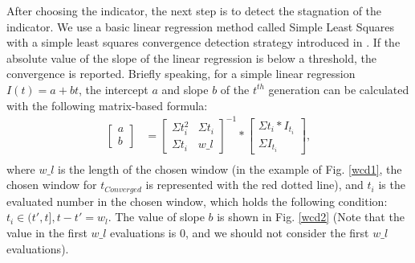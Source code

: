 \documentclass[conference]{IEEEtran}
\begin{document}
After choosing the indicator, the next step is to detect the stagnation of the indicator.
We use a basic linear regression method called Simple Least Squares\cite{SimpleLeastSquares} with a
simple least squares convergence detection strategy introduced in \cite{convergenceDetection:LSSC}.
If the absolute value of the slope of the linear regression is below a threshold, the convergence is reported.
Briefly speaking, for a simple linear regression $I(t)=a+bt$, 
the intercept $a$ and slope $b$ of the $t^{th}$ generation can be calculated 
with the following matrix-based formula:
\begin{equation}\begin{aligned}\label{elr1}
  \left[
    \begin{matrix}
      a \\
      b
    \end{matrix}
  \right]
  &= 
  \left[
    \begin{matrix}
      \Sigma t_i^2 & \Sigma t_i \\
      \Sigma t_i   & w\_l 
    \end{matrix}
  \right]^{-1}
  *
  \left[
    \begin{matrix}
      \Sigma t_i * I_{t_i} \\
      \Sigma I_{t_i} 
    \end{matrix}
  \right], \\
\end{aligned}
\end{equation}
where $w\_ l$ is the length of the chosen window
(in the example of Fig. \ref{wcd1}, the chosen window for $t_{Converged}$ is represented with the red dotted line), 
and $t_i$ is the evaluated number in the chosen window, 
which holds the following condition: $t_i \in (t',t], t - t' = w_l$.
The value of slope $b$ is shown in Fig. \ref{wcd2} 
(Note that the value in the first $w\_ l$ evaluations is 0, 
and we should not consider the first $w\_ l$ evaluations). 
\end{document}
